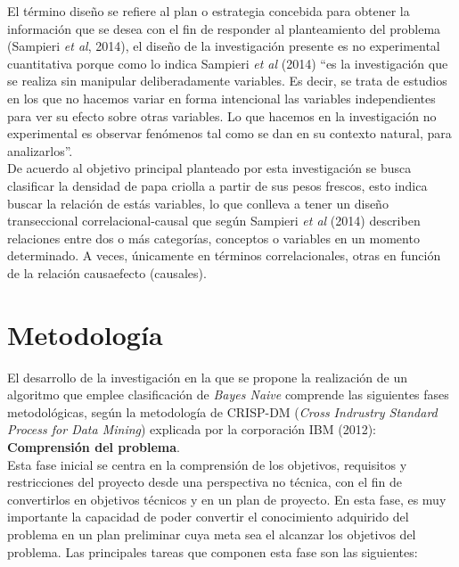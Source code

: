 El término diseño se refiere al plan o estrategia concebida para obtener la información que se desea con el fin de responder al
planteamiento del problema (Sampieri \textit{et al}, 2014), el diseño de la investigación presente es no experimental cuantitativa porque como lo indica Sampieri \textit{et al} (2014) “es la investigación que se realiza sin manipular deliberadamente variables. Es decir, se trata de estudios en los que no hacemos variar en forma intencional las variables independientes para ver su efecto sobre otras variables. Lo que hacemos en la investigación no experimental es observar fenómenos tal como se dan en su contexto natural, para analizarlos”.\\

De acuerdo al objetivo principal planteado por esta investigación se busca clasificar la densidad de papa criolla a partir de sus pesos frescos, esto indica buscar la relación de estás variables, lo que conlleva a tener un diseño transeccional correlacional-causal que según Sampieri \textit{et al} (2014) describen relaciones entre dos o más categorías, conceptos o variables en un momento determinado. A veces, únicamente en términos correlacionales, otras en función de la relación causaefecto (causales).
  

\section{Metodolog\'ia}

El desarrollo de la investigación en la que se propone la realización de un algoritmo que emplee clasificación de \textit{Bayes Naive} comprende las siguientes fases metodológicas, según la metodología de CRISP-DM (\emph{Cross Indrustry Standard Process for Data Mining}) explicada por la corporación IBM (2012):\\

\noindent
\textbf{Comprensión del problema}.\\

	Esta fase inicial se centra en la comprensión de los objetivos, requisitos y restricciones del proyecto desde una perspectiva no técnica, con el fin de convertirlos en objetivos técnicos y en un plan de proyecto. En esta fase, es muy importante la capacidad de poder convertir el conocimiento adquirido del problema en un plan preliminar cuya meta sea el alcanzar los objetivos del problema. Las principales tareas que componen esta fase son las siguientes:\\

